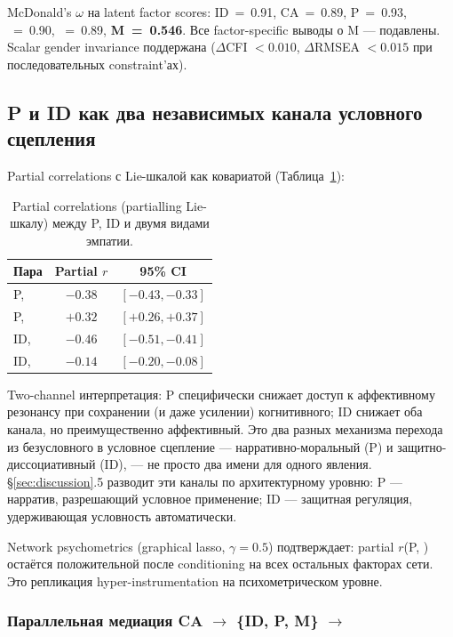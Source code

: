 McDonald's $\omega$ на latent factor scores: ID~=~0.91, CA~=~0.89, P~=~0.93, \EAF{}~=~0.90, \Ecog{}~=~0.89, \textbf{M~=~0.546}. Все factor-specific выводы о M --- подавлены. Scalar gender invariance \citep{byrne2008} поддержана ($\Delta$CFI $< 0.010$, $\Delta$RMSEA $< 0.015$ при последовательных constraint'ах).

\subsection{P и ID как два независимых канала условного сцепления}

Partial correlations с Lie-шкалой как ковариатой (Таблица~\ref{tab:partial_corrs}):

\begin{table}[htbp]
\centering
\caption{Partial correlations (partialling Lie-шкалу) между P, ID и двумя видами эмпатии.}
\label{tab:partial_corrs}
\begin{tabular}{lcc}
\toprule
Пара & Partial $r$ & 95\% CI \\
\midrule
P, \EAF{} & $-0.38$ & $[-0.43, -0.33]$ \\
P, \Ecog{} & $+0.32$ & $[+0.26, +0.37]$ \\
ID, \EAF{} & $-0.46$ & $[-0.51, -0.41]$ \\
ID, \Ecog{} & $-0.14$ & $[-0.20, -0.08]$ \\
\bottomrule
\end{tabular}
\end{table}

Two-channel интерпретация: P специфически снижает доступ к аффективному резонансу при сохранении (и даже усилении) когнитивного; ID снижает оба канала, но преимущественно аффективный. Это два разных механизма перехода из безусловного в условное сцепление --- нарративно-моральный (P) и защитно-диссоциативный (ID), --- не просто два имени для одного явления. §\ref{sec:discussion}.5 разводит эти каналы по архитектурному уровню: P --- нарратив, разрешающий условное применение; ID --- защитная регуляция, удерживающая условность автоматически.

Network psychometrics (graphical lasso, $\gamma = 0.5$) подтверждает: partial $r$(P, \Ecog{}) остаётся положительной после conditioning на всех остальных факторах сети. Это репликация \citet{blair2013, baroncohen2011} hyper-instrumentation на психометрическом уровне.

\subsubsection{\texorpdfstring{Параллельная медиация CA $\to$ \{ID, P, M\} $\to$ \EAF{}}{Параллельная медиация CA -> {ID, P, M} -> E\_AF}}
\label{subsubsec:parallel_mediation}

